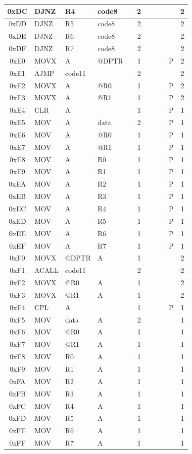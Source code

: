 \documentclass[a4paper,twoside,12pt]{book}
\begin{document}
{\begin{longtable}{|c|l|lll|c|llll|c|}
		0xDC	& DJNZ	& R4	& code8	&	& 2	&	&	&	&	& 2	\\\hline
		0xDD	& DJNZ	& R5	& code8	&	& 2	&	&	&	&	& 2	\\\hline
		0xDE	& DJNZ	& R6	& code8	&	& 2	&	&	&	&	& 2	\\\hline
		0xDF	& DJNZ	& R7	& code8	&	& 2	&	&	&	&	& 2	\\\hline
		0xE0	& MOVX	& A	& @DPTR	&	& 1	&	&	&	& P	& 2	\\\hline
		0xE1	& AJMP	& code11&	&	& 2	&	&	&	&	& 2	\\\hline
		0xE2	& MOVX	& A	& @R0	&	& 1	&	&	&	& P	& 2	\\\hline
		0xE3	& MOVX	& A	& @R1	&	& 1	&	&	&	& P	& 2	\\\hline
		0xE4	& CLR	& A	&	&	& 1	&	&	&	& P	& 1	\\\hline
		0xE5	& MOV	& A	& data	&	& 2	&	&	&	& P	& 1	\\\hline
		0xE6	& MOV	& A	& @R0	&	& 1	&	&	&	& P	& 1	\\\hline
		0xE7	& MOV	& A	& @R1	&	& 1	&	&	&	& P	& 1	\\\hline
		0xE8	& MOV	& A	& R0	&	& 1	&	&	&	& P	& 1	\\\hline
		0xE9	& MOV	& A	& R1	&	& 1	&	&	&	& P	& 1	\\\hline
		0xEA	& MOV	& A	& R2	&	& 1	&	&	&	& P	& 1	\\\hline
		0xEB	& MOV	& A	& R3	&	& 1	&	&	&	& P	& 1	\\\hline
		0xEC	& MOV	& A	& R4	&	& 1	&	&	&	& P	& 1	\\\hline
		0xED	& MOV	& A	& R5	&	& 1	&	&	&	& P	& 1	\\\hline
		0xEE	& MOV	& A	& R6	&	& 1	&	&	&	& P	& 1	\\\hline
		0xEF	& MOV	& A	& R7	&	& 1	&	&	&	& P	& 1	\\\hline
		0xF0	& MOVX	& @DPTR	& A	&	& 1	&	&	&	&	& 2	\\\hline
		0xF1	& ACALL	& code11&	&	& 2	&	&	&	&	& 2	\\\hline
		0xF2	& MOVX	& @R0	& A	&	& 1	&	&	&	&	& 2	\\\hline
		0xF3	& MOVX	& @R1	& A	&	& 1	&	&	&	&	& 2	\\\hline
		0xF4	& CPL	& A	&	&	& 1	&	&	&	& P	& 1	\\\hline
		0xF5	& MOV	& data	& A	&	& 2	&	&	&	&	& 1	\\\hline
		0xF6	& MOV	& @R0	& A	&	& 1	&	&	&	&	& 1	\\\hline
		0xF7	& MOV	& @R1	& A	&	& 1	&	&	&	&	& 1	\\\hline
		0xF8	& MOV	& R0	& A	&	& 1	&	&	&	&	& 1	\\\hline
		0xF9	& MOV	& R1	& A	&	& 1	&	&	&	&	& 1	\\\hline
		0xFA	& MOV	& R2	& A	&	& 1	&	&	&	&	& 1	\\\hline
		0xFB	& MOV	& R3	& A	&	& 1	&	&	&	&	& 1	\\\hline
		0xFC	& MOV	& R4	& A	&	& 1	&	&	&	&	& 1	\\\hline
		0xFD	& MOV	& R5	& A	&	& 1	&	&	&	&	& 1	\\\hline
		0xFE	& MOV	& R6	& A	&	& 1	&	&	&	&	& 1	\\\hline
		0xFF	& MOV	& R7	& A	&	& 1	&	&	&	&	& 1	\\\hline


\end{longtable}}
\end{document}

